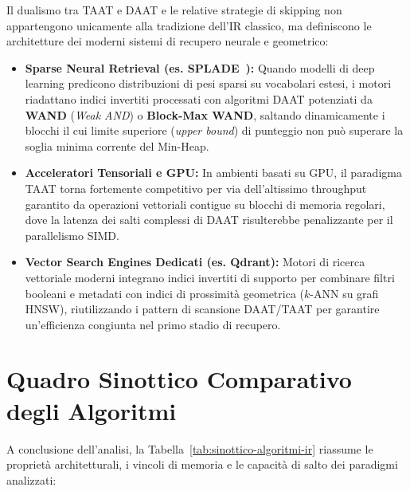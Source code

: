 Il dualismo tra TAAT e DAAT e le relative strategie di skipping non appartengono unicamente alla tradizione dell'IR classico, ma definiscono le architetture dei moderni sistemi di recupero neurale e geometrico:
\begin{itemize}
    \item \textbf{Sparse Neural Retrieval (es. SPLADE~\cite{formal2021}):} Quando modelli di deep learning predicono distribuzioni di pesi sparsi su vocabolari estesi, i motori riadattano indici invertiti processati con algoritmi DAAT potenziati da \textbf{WAND} (\textit{Weak AND}) o \textbf{Block-Max WAND}, saltando dinamicamente i blocchi il cui limite superiore (\textit{upper bound}) di punteggio non pu\`o superare la soglia minima corrente del Min-Heap.
    \item \textbf{Acceleratori Tensoriali e GPU:} In ambienti basati su GPU, il paradigma TAAT torna fortemente competitivo per via dell'altissimo throughput garantito da operazioni vettoriali contigue su blocchi di memoria regolari, dove la latenza dei salti complessi di DAAT risulterebbe penalizzante per il parallelismo SIMD.
    \item \textbf{Vector Search Engines Dedicati (es. Qdrant):} Motori di ricerca vettoriale moderni integrano indici invertiti di supporto per combinare filtri booleani e metadati con indici di prossimit\`a geometrica ($k$-ANN su grafi HNSW), riutilizzando i pattern di scansione DAAT/TAAT per garantire un'efficienza congiunta nel primo stadio di recupero.
\end{itemize}

\FloatBarrier
\section{Quadro Sinottico Comparativo degli Algoritmi}
\label{sec:quadro-sinottico-finale}

A conclusione dell'analisi, la Tabella~\ref{tab:sinottico-algoritmi-ir} riassume le propriet\`a architetturali, i vincoli di memoria e le capacit\`a di salto dei paradigmi analizzati:

